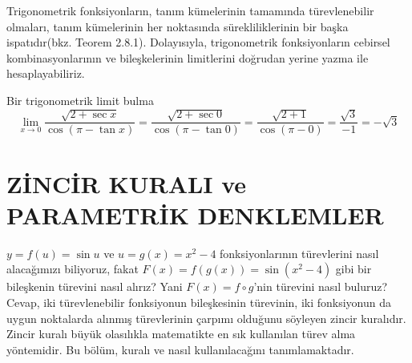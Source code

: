 Trigonometrik fonksiyonların, tanım kümelerinin tamamında türevlenebilir olmaları, tanım kümelerinin her noktasında sürekliliklerinin bir başka ispatıdır(bkz. Teorem 2.8.1). Dolayısıyla, trigonometrik fonksiyonların cebirsel kombinasyonlarının ve bileşkelerinin limitlerini doğrudan yerine yazma ile hesaplayabiliriz.
\begin{ornek}Bir trigonometrik limit bulma
	\begin{equation*}
	\lim_{x \rightarrow 0}\frac{\sqrt{2+\sec x}}{\cos (\pi - \tan x)}=\frac{\sqrt{2+\sec 0}}{\cos (\pi - \tan 0)}=\frac{\sqrt{2+1}}{\cos (\pi - 0)}=\frac{\sqrt{3}}{-1}=-\sqrt{3}
	\end{equation*}
\end{ornek}

\chapter{\protect ZİNCİR KURALI ve PARAMETRİK DENKLEMLER}
$y=f(u)=\sin u$ ve $u=g(x)=x^2-4$ fonksiyonlarının türevlerini nasıl alacağımızı biliyoruz, fakat $F(x)=f(g(x))=\sin (x^2-4)$ gibi bir bileşkenin türevini nasıl alırız? Yani $F(x) = f \circ g$'nin türevini nasıl buluruz? Cevap, iki türevlenebilir fonksiyonun bileşkesinin türevinin, iki fonksiyonun da uygun noktalarda alınmış türevlerinin çarpımı olduğunu söyleyen zincir kuralıdır. Zincir kuralı büyük olasılıkla matematikte en sık kullanılan türev alma yöntemidir. Bu bölüm, kuralı ve nasıl kullanılacağını tanımlamaktadır.
